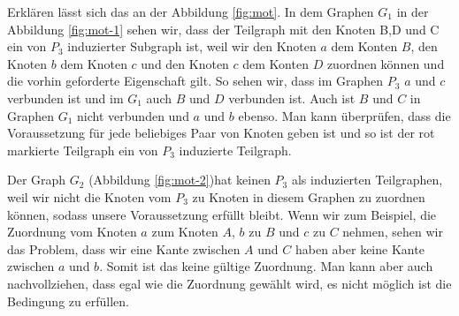 \documentclass[12pt,a4paper,onecolumn,oneside,titlepage]{article}
\begin{document}
Erklären lässt sich das an der Abbildung \ref{fig:mot}.
In dem Graphen $G_1$ in der Abbildung \ref{fig:mot-1} sehen wir, dass der Teilgraph mit den Knoten B,D und C ein von $P_3$ induzierter Subgraph ist, weil wir den Knoten $a$ dem Konten $B$, den Knoten $b$ dem Knoten $c$ und den Knoten $c$ dem Konten $D$ zuordnen können und die vorhin geforderte Eigenschaft gilt.
So sehen wir, dass im Graphen $P_3$ $a$ und $c$ verbunden ist und im  
$G_1$ auch $B$ und $D$ verbunden ist. Auch ist $B$ und $C$ in Graphen $G_1$ nicht verbunden und $a$ und $b$ ebenso.  Man kann überprüfen, dass die Voraussetzung für jede beliebiges Paar von Knoten geben ist und so ist der rot markierte Teilgraph ein von $P_3$ induzierte Teilgraph. 

Der Graph $G_2$ (Abbildung \ref{fig:mot-2})hat keinen $P_3$ als induzierten Teilgraphen, weil wir nicht die Knoten vom $P_3$ zu Knoten in diesem Graphen zu zuordnen können, sodass unsere Voraussetzung erfüllt bleibt. Wenn wir zum Beispiel, die Zuordnung vom Knoten $a$ zum Knoten $A$, $b$ zu $B$ und $c$ zu $C$ nehmen, sehen wir das Problem, dass wir eine Kante zwischen $A$ und $C$ haben aber keine Kante zwischen $a$ und $b$. Somit ist das keine gültige Zuordnung. Man kann aber auch nachvollziehen, dass egal wie die Zuordnung gewählt wird, es nicht möglich ist die Bedingung zu erfüllen.
\end{document}
